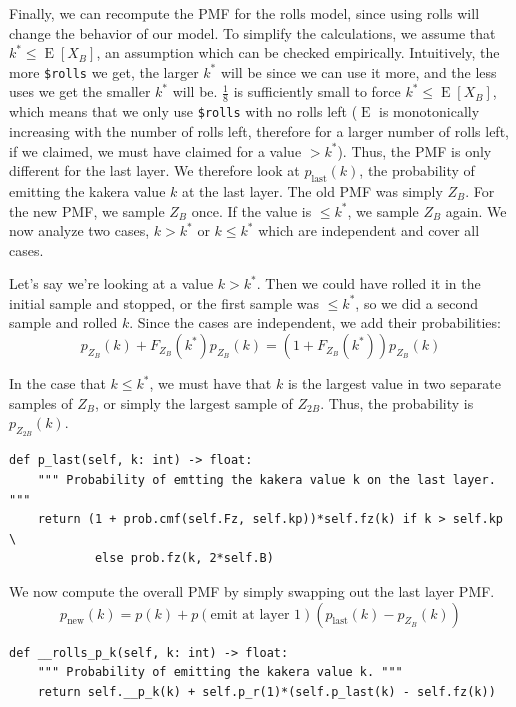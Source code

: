 \documentclass[11pt, oneside]{article}
\DeclareMathOperator{\E}{E}
\theoremstyle{plain}
\theoremstyle{definition}
\begin{document}
Finally, we can recompute the PMF for the rolls model, since using rolls will
change the behavior of our model. To simplify the calculations, we assume
that \( k^* \leq \E[X_B] \), an assumption which can be checked empirically.
Intuitively, the more \texttt{\$rolls} we get, the larger \( k^* \) will be
since we can use it more, and the less uses we get the smaller \( k^* \) will
be. \( \frac{1}{8} \) is sufficiently small to force \( k^* \leq \E[X_B] \),
which means that we only use \texttt{\$rolls} with no rolls left (\( \E \) is
monotonically increasing with the number of rolls left, therefore for a larger
number of rolls left, if we claimed, we must have claimed for a value \( > k^*
\)). Thus, the PMF is only different for the last layer. We therefore look at
\( p_{\text{last}}(k) \), the probability of emitting the kakera value \( k
\) at the last layer. The old PMF was simply \( Z_B \). For the new PMF, we
sample \( Z_B \) once. If the value is \( \leq k^* \), we sample \( Z_B \)
again. We now analyze two cases, \( k > k^* \) or \( k \leq k^* \) which are
independent and cover all cases.

Let's say we're looking at a value \( k > k^* \). Then we could have rolled it
in the initial sample and stopped, or the first sample was \( \leq k^* \), so
we did a second sample and rolled \( k \). Since the cases are independent, we
add their probabilities:
\[ p_{Z_B}(k) + F_{Z_B}(k^*) p_{Z_B}(k) = (1 + F_{Z_B}(k^*)) p_{Z_B}(k) \] 

In the case that \( k \leq k^* \), we must have that \( k \) is the largest
value in two separate samples of \( Z_B \), or simply the largest sample of
\( Z_{2B} \). Thus, the probability is \( p_{Z_{2B}}(k) \).
\begin{verbatim}
def p_last(self, k: int) -> float:
    """ Probability of emtting the kakera value k on the last layer. """
    return (1 + prob.cmf(self.Fz, self.kp))*self.fz(k) if k > self.kp \
            else prob.fz(k, 2*self.B)
\end{verbatim}

We now compute the overall PMF by simply swapping out the last layer PMF.
\[ p_\text{new}(k) = p(k) + p(\text{emit at layer 1})
  (p_\text{last}(k) - p_{Z_B}(k)) \]
\begin{verbatim}
def __rolls_p_k(self, k: int) -> float:
    """ Probability of emitting the kakera value k. """
    return self.__p_k(k) + self.p_r(1)*(self.p_last(k) - self.fz(k))
\end{verbatim}
\end{document}
